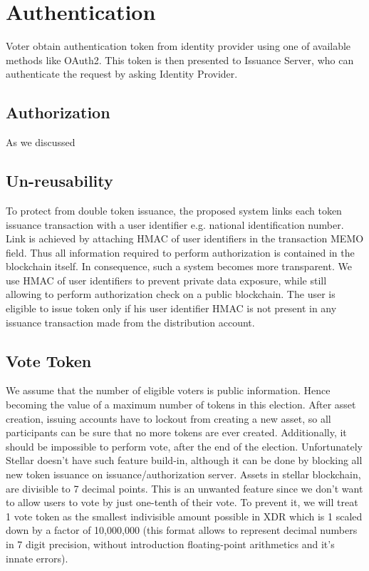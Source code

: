 \documentclass[runningheads]{llncs}
\begin{document}
\section{Authentication}
Voter obtain authentication token from identity provider using one of available methods like OAuth2. This token is then presented to Issuance Server, who can authenticate the request by asking Identity Provider.

\subsection{Authorization}
As we discussed

\subsection{Un-reusability}
To protect from double token issuance, the proposed system links each token issuance transaction with a user identifier e.g. national identification number. Link is achieved by attaching HMAC of user identifiers in the transaction MEMO field. Thus all information required to perform authorization is contained in the blockchain itself. In consequence, such a system becomes more transparent. We use HMAC of user identifiers to prevent private data exposure, while still allowing to perform authorization check on a public blockchain. The user is eligible to issue token only if his user identifier HMAC is not present in any issuance transaction made from the distribution account.

\subsection{Vote Token}
We assume that the number of eligible voters is public information. Hence becoming the value of a maximum number of tokens in this election. After asset creation, issuing accounts have to lockout from creating a new asset, so all participants can be sure that no more tokens are ever created. Additionally, it should be impossible to perform vote, after the end of the election. Unfortunately Stellar doesn’t have such feature build-in, although it can be done by blocking all new token issuance on issuance/authorization server.
Assets in stellar blockchain, are divisible to 7 decimal points. This is an unwanted feature since we don’t want to allow users to vote by just one-tenth of their vote. To prevent it, we will treat 1 vote token as the smallest indivisible amount possible in XDR which is 1 scaled down by a factor of 10,000,000 (this format allows to represent decimal numbers in 7 digit precision, without introduction floating-point arithmetics and it’s innate errors).
\end{document}
